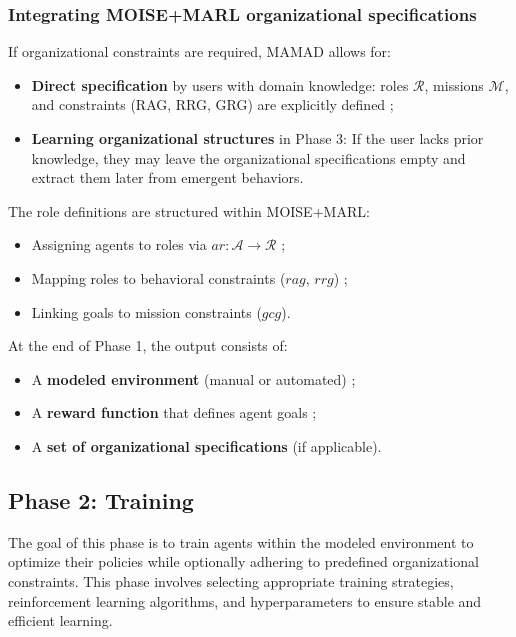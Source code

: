 \documentclass[pdflatex,sn-mathphys-num]{sn-jnl}%
\theoremstyle{thmstyleone}%
\theoremstyle{thmstyletwo}%
\theoremstyle{thmstylethree}%
\begin{document}
\subsubsection{Integrating MOISE+MARL organizational specifications}
If organizational constraints are required, MAMAD allows for:
\begin{itemize}
    \item \textbf{Direct specification} by users with domain knowledge: roles $\mathcal{R}$, missions $\mathcal{M}$, and constraints (RAG, RRG, GRG) are explicitly defined ;
    \item \textbf{Learning organizational structures} in Phase 3: If the user lacks prior knowledge, they may leave the organizational specifications empty and extract them later from emergent behaviors.
\end{itemize}

The role definitions are structured within MOISE+MARL:
\begin{itemize}
    \item Assigning agents to roles via $ar: \mathcal{A} \to \mathcal{R}$ ;
    \item Mapping roles to behavioral constraints ($rag$, $rrg$) ;
    \item Linking goals to mission constraints ($gcg$).
\end{itemize}

At the end of Phase 1, the output consists of:
\begin{itemize}
    \item A \textbf{modeled environment} (manual or automated) ;
    \item A \textbf{reward function} that defines agent goals ;
    \item A \textbf{set of organizational specifications} (if applicable).
\end{itemize}

\subsection{Phase 2: Training}

The goal of this phase is to train agents within the modeled environment to optimize their policies while optionally adhering to predefined organizational constraints. This phase involves selecting appropriate training strategies, reinforcement learning algorithms, and hyperparameters to ensure stable and efficient learning.
\end{document}
